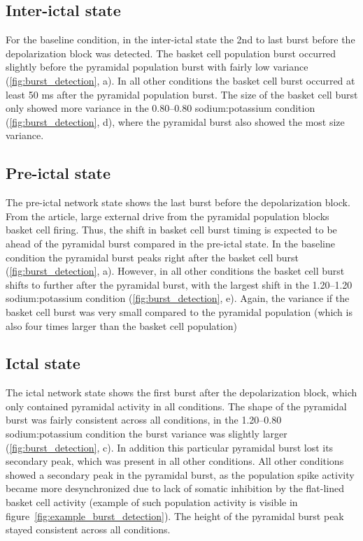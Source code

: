 \subsection{Inter-ictal state}
For the baseline condition, in the inter-ictal state the 2nd to last burst before the depolarization block was detected.
The basket cell population burst occurred slightly before the pyramidal population burst with fairly low variance (\ref{fig:burst_detection}, a).
In all other conditions the basket cell burst occurred at least 50 ms after the pyramidal population burst.
The size of the basket cell burst only showed more variance in the 0.80--0.80 sodium:potassium condition (\ref{fig:burst_detection}, d), where the pyramidal burst also showed the most size variance.

\subsection{Pre-ictal state}
The pre-ictal network state shows the last burst before the depolarization block.
From the \textcite{sanjayImpairedDendriticInhibition2015} article, large external drive from the pyramidal population blocks basket cell firing.
Thus, the shift in basket cell burst timing is expected to be ahead of the pyramidal burst compared in the pre-ictal state.
In the baseline condition the pyramidal burst peaks right after the basket cell burst (\ref{fig:burst_detection}, a).
However, in all other conditions the basket cell burst shifts to further after the pyramidal burst, with the largest shift in the 1.20--1.20 sodium:potassium condition (\ref{fig:burst_detection}, e).
Again, the variance if the basket cell burst was very small compared to the pyramidal population (which is also four times larger than the basket cell population)

\subsection{Ictal state}
The ictal network state shows the first burst after the depolarization block, which only contained pyramidal activity in all conditions.
The shape of the pyramidal burst was fairly consistent across all conditions, in the 1.20--0.80 sodium:potassium condition the burst variance was slightly larger (\ref{fig:burst_detection}, c).
In addition this particular pyramidal burst lost its secondary peak, which was present in all other conditions.
All other conditions showed a secondary peak in the pyramidal burst, as the population spike activity became more desynchronized due to lack of somatic inhibition by the flat-lined basket cell activity (example of such population activity is visible in figure~\ref{fig:example_burst_detection}).
The height of the pyramidal burst peak stayed consistent across all conditions.

